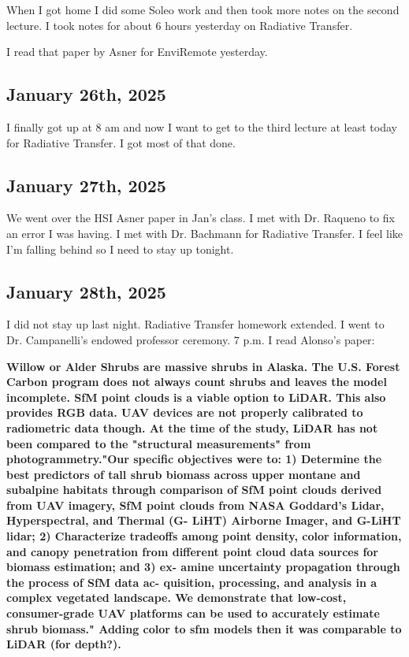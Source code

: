 \documentclass{article}
\begin{document}
When I got home I did some Soleo work and then took more notes on the second lecture. I took notes for about 6 hours yesterday on Radiative Transfer. 

I read that paper by Asner for EnviRemote yesterday. 


\subsection{January 26th, 2025}
I finally got up at 8 am and now I want to get to the third lecture at least today for Radiative Transfer. I got most of that done.


\subsection{January 27th, 2025}
We went over the HSI Asner paper in Jan's class. 
I met with Dr. Raqueno to fix an error I was having. 
I met with Dr. Bachmann for Radiative Transfer. 
I feel like I'm falling behind so I need to stay up tonight. 


\subsection{January 28th, 2025}
I did not stay up last night. Radiative Transfer homework extended. 
I went to Dr. Campanelli's endowed professor ceremony. 
7 p.m. 
I read Alonso's paper: 

\textbf{Willow or Alder Shrubs are massive shrubs in Alaska. The U.S. Forest Carbon program does not always count shrubs and leaves the model incomplete. SfM point clouds is a viable option to LiDAR. This also provides RGB data. UAV devices are not properly calibrated to radiometric data though. At the time of the study, LiDAR has not been compared to the "structural measurements" from photogrammetry."Our 
specific objectives were to: 1) Determine the best predictors of tall 
shrub biomass across upper montane and subalpine habitats through 
comparison of SfM point clouds derived from UAV imagery, SfM point 
clouds from NASA Goddard's Lidar, Hyperspectral, and Thermal (G-
LiHT) Airborne Imager, and G-LiHT lidar; 2) Characterize tradeoffs 
among point density, color information, and canopy penetration from 
different point cloud data sources for biomass estimation; and 3) ex-
amine uncertainty propagation through the process of SfM data ac-
quisition, processing, and analysis in a complex vegetated landscape. 
We demonstrate that low-cost, consumer-grade UAV platforms can be 
used to accurately estimate shrub biomass." Adding color to sfm models then it was comparable to LiDAR (for depth?).}
\end{document}
